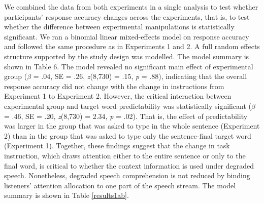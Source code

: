 \documentclass[a4paper, nobind]{templates/ociamthesis}
\begin{document}
We combined the data from both experiments in a single analysis to test whether participants' response accuracy changes across the experiments,
that is, to test whether the difference between experimental manipulations is statistically significant.
We ran a binomial linear mixed-effects model on response accuracy and followed the same procedure as in Experiments 1 and 2.
A full random effects structure supported by the study design was modelled.
The model summary is shown in Table 6.
The model revealed no significant main effect of experimental group
(\(\beta\) = .04, SE = .26, \emph{z}(8,730) = .15, \emph{p} = .88), indicating that the overall response accuracy did not change with the change in instructions from Experiment 1 to Experiment 2.
However, the critical interaction between experimental group and target word predictability was statistically significant
(\(\beta\) = .46, SE = .20, \emph{z}(8,730) = 2.34, \emph{p} = .02).
That is, the effect of predictability was larger in the group that was asked to type in the whole sentence (Experiment 2) than in the group that was asked to type only the sentence-final target word (Experiment 1).
Together, these findings suggest that the change in task instruction, which draws attention either to the entire sentence or only to the final word, is critical to whether the context information is used under degraded speech.
Nonetheless, degraded speech comprehension is not reduced by binding listeners' attention allocation to one part of the speech stream.
The model summary is shown in Table \ref{results1ab}.
\end{document}
